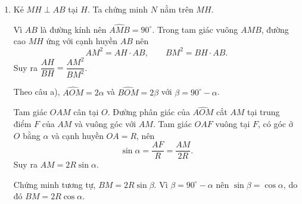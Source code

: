 \begin{bt}[3,0 điểm]
{\begin{enumerate}
Hai tiếp tuyến xuất phát từ cùng một điểm thì bằng nhau, nên $CA=CM$ và $DB=DM$.

Xét $\triangle OAC$ và $\triangle OMC$:
\[
OA=OM,\qquad CA=CM,\qquad OC\text{ chung}.
\]
Suy ra $\triangle OAC\backsim\triangle OMC$ (c.c.c), nên $\widehat{AOC}=\widehat{COM}$.

Hai góc này kề nhau và $\widehat{AOC}+\widehat{COM}=\widehat{AOM}$, nên $OC$ là tia phân giác của $\widehat{AOM}$.

Tương tự, $\triangle OBD\backsim\triangle OMD$ (c.c.c), nên $OD$ là tia phân giác của $\widehat{BOM}$.

Vì $A$, $O$, $B$ thẳng hàng nên $\widehat{AOM}+\widehat{BOM}=180^\circ$. Do đó
\[
\widehat{COD}
=\widehat{COM}+\widehat{MOD}
=\dfrac12\widehat{AOM}+\dfrac12\widehat{BOM}
=\dfrac12\cdot 180^\circ
=90^\circ.
\]

Đặt $\widehat{AOC}=\widehat{COM}=\alpha$ và $\widehat{BOD}=\widehat{DOM}=\beta$. Khi đó $2\alpha+2\beta=180^\circ$, nên $\alpha+\beta=90^\circ$ và $\beta=90^\circ-\alpha$.

Tam giác $OAC$ vuông tại $A$, nên
\[
\tan\alpha=\dfrac{AC}{OA}=\dfrac{AC}{R}\Rightarrow AC=R\tan\alpha.
\]
Tam giác $OBD$ vuông tại $B$, nên
\[
\tan\beta=\dfrac{BD}{OB}=\dfrac{BD}{R}.
\]
Vì $\tan(90^\circ-\alpha)=\cot\alpha$ nên $BD=R\cot\alpha$.

Do đó
\[
AC\cdot BD=R\tan\alpha\cdot R\cot\alpha=R^2.
\]
Mặt khác
\[
\dfrac{AB^2}{4}=\dfrac{(2R)^2}{4}=R^2.
\]
Vậy $\widehat{COD}=90^\circ$ và $AC\cdot BD=\dfrac{AB^2}{4}$.

\item Kẻ $MH\perp AB$ tại $H$. Ta chứng minh $N$ nằm trên $MH$.

Vì $AB$ là đường kính nên $\widehat{AMB}=90^\circ$. Trong tam giác vuông $AMB$, đường cao $MH$ ứng với cạnh huyền $AB$ nên
\[
AM^2=AH\cdot AB,\qquad BM^2=BH\cdot AB.
\]
Suy ra $\dfrac{AH}{BH}=\dfrac{AM^2}{BM^2}$.

Theo câu a), $\widehat{AOM}=2\alpha$ và $\widehat{BOM}=2\beta$ với $\beta=90^\circ-\alpha$.

Tam giác $OAM$ cân tại $O$. Đường phân giác của $\widehat{AOM}$ cắt $AM$ tại trung điểm $F$ của $AM$ và vuông góc với $AM$. Tam giác $OAF$ vuông tại $F$, có góc ở $O$ bằng $\alpha$ và cạnh huyền $OA=R$, nên
\[
\sin\alpha=\dfrac{AF}{R}=\dfrac{AM}{2R}.
\]
Suy ra $AM=2R\sin\alpha$.

Chứng minh tương tự, $BM=2R\sin\beta$. Vì $\beta=90^\circ-\alpha$ nên $\sin\beta=\cos\alpha$, do đó $BM=2R\cos\alpha$.


\end{enumerate}}
\end{bt}
